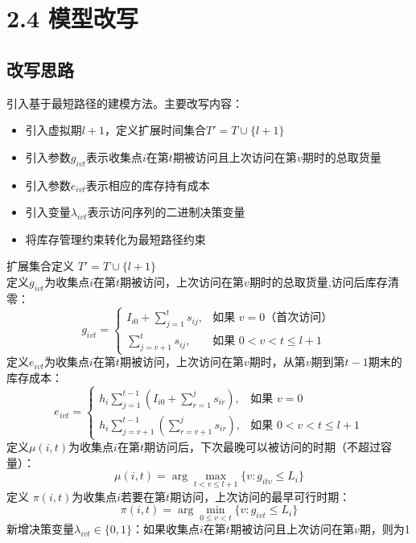 \documentclass{article}
\begin{document}
\section{2.4 模型改写}

\subsection{改写思路}
引入基于最短路径的建模方法。主要改写内容：
\begin{itemize}
\item 引入虚拟期$l+1$，定义扩展时间集合$T' = T \cup \{l+1\}$
\item 引入参数$g_{ivt}$表示收集点$i$在第$t$期被访问且上次访问在第$v$期时的总取货量
\item 引入参数$e_{ivt}$表示相应的库存持有成本
\item 引入变量$\lambda_{ivt}$表示访问序列的二进制决策变量
\item 将库存管理约束转化为最短路径约束
\end{itemize}



\newpage
\noindent
扩展集合定义 $T' = T \cup \{l+1\}$ \\
定义$g_{ivt}$为收集点$i$在第$t$期被访问，上次访问在第$v$期时的总取货量,访问后库存清零：
\begin{equation*}
g_{ivt} = \begin{cases}
I_{i0} + \sum_{j=1}^{t} s_{ij}, & \text{如果 } v = 0 \text{（首次访问）}\\
\sum_{j=v+1}^{t} s_{ij}, & \text{如果 } 0 < v < t \leq l+1
\end{cases}
\end{equation*}
定义$e_{ivt}$为收集点$i$在第$t$期被访问，上次访问在第$v$期时，从第$v$期到第$t-1$期末的库存成本：
\begin{equation*}
e_{ivt} = \begin{cases}
h_i \sum_{j=1}^{t-1} \left(I_{i0} + \sum_{r=1}^{j} s_{ir}\right), & \text{如果 } v = 0 \\
h_i \sum_{j=v+1}^{t-1} \left(\sum_{r=v+1}^{j} s_{ir}\right), & \text{如果 } 0 < v < t \leq l+1
\end{cases}
\end{equation*}
定义$\mu(i,t)$为收集点$i$在第$t$期访问后，下次最晚可以被访问的时期（不超过容量）：
\[\mu(i,t) = \arg\max_{t<v\leq l+1}\{v : g_{itv} \leq L_i\} \]
定义 $\pi(i,t)$为收集点$i$若要在第$t$期访问，上次访问的最早可行时期：
\[\pi(i,t) = \arg\min_{0\leq v<t}\{v : g_{ivt} \leq L_i\} \]
新增决策变量$\lambda_{ivt} \in \{0,1\}$：如果收集点$i$在第$t$期被访问且上次访问在第$v$期，则为1
\end{document}
